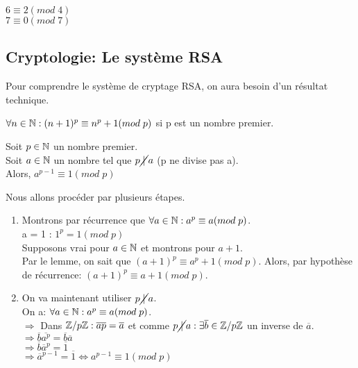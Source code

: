 \begin{exmp}
$6 \equiv 2(mod\;4)$\\
$7 \equiv 0(mod\;7)$
\end{exmp}

\newpage

\subsection{Cryptologie: Le système RSA}

Pour comprendre le système de cryptage RSA, on aura besoin d'un résultat technique.

\begin{lemme}
$\forall n \in \mathbb{N}: (n+1)^p \equiv n^p + 1(mod\;p)$ si p est un nombre premier.
\end{lemme}

\begin{thrm}
Soit $p\in \mathbb{N}$ un nombre premier.\\
Soit $a\in \mathbb{N}$ un nombre tel que $p\cancel{\;|\;}a$ (p ne divise pas a).\\
Alors, $a^{p-1} \equiv 1(mod\;p)$\\
\end{thrm}

\begin{demo}
Nous allons procéder par plusieurs étapes.\\

\begin{enumerate}
	\item Montrons par récurrence que $\forall a \in \mathbb{N}: a^p \equiv a(mod\;p)$.\\
	a = 1 : $1^p = 1(mod\;p)$\\
	Supposons vrai pour $a \in \mathbb{N}$ et montrons pour $a+1$.\\
	Par le lemme, on sait que $(a+1)^p \equiv a^p + 1(mod\;p)$. Alors, par hypothèse de récurrence: $(a+1)^p \equiv a + 1(mod\;p)$.\\
	\item On va maintenant utiliser $p\cancel{\;|\;}a$.\\
	On a: $\forall a \in \mathbb{N}: a^p \equiv a(mod\;p)$.\\
	$\Rightarrow$ Dans $\mathbb{Z}/p\mathbb{Z}: \overline{ap}=\overline{a}$ et comme $p\cancel{\;|\;}a: \exists \overline{b} \in \mathbb{Z}/p\mathbb{Z}$ un inverse de $\overline{a}$.\\
	$\Rightarrow \overline{b}\overline{a^p} = \overline{b}\overline{a}$\\
	$\Rightarrow \overline{b}\overline{a}^p = \overline{1}$\\
	$\Rightarrow \overline{a}^{p-1} = \overline{1} \Leftrightarrow a^{p-1} \equiv 1(mod\;p)$\\ 

\end{enumerate}
\end{demo}

